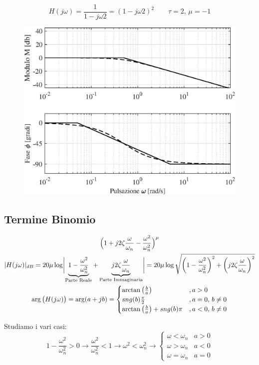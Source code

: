 \begin{nexample}
	\[ H(j\omega) = \frac{1}{1-j\omega2} = (1-j\omega2)^2 \qquad\tau = 2, \, \mu = -1 \]
\begin{figure}[H]
	\centering
	\includegraphics[width=0.7\linewidth]{immagini/cap6_Bode/es4}
	\label{fig:Bode_es4}
\end{figure}	
\end{nexample}

\subsection{Termine Binomio}
\begin{gather*}
	\Big(1+j2\zeta\frac{\omega}{\omega_{n}}-\frac{\omega^2}{\omega^{2}_{n}} \Big)^{\mu}\\
	\abs{H(j\omega)}_{dB} = 20 \mu \log \Abs{\underbrace{1-\frac{\omega^2}{\omega^{2}_{n}}}_{\text{\scriptsize Parte Reale}}+\underbrace{j2\zeta\frac{\omega}{\omega_{n}}}_{\text{\scriptsize Parte Immaginaria}}} = 20\mu \log \sqrt{\bigg(1-\frac{\omega^2}{\omega^{2}_{n}} \bigg)^2+\bigg(j2\zeta\frac{\omega}{\omega_{n}}\bigg)^2}\\
	\arg\big(H(j\omega)\big) = \arg(a+jb) = 
	\begin{cases}
		\arctan\big(\frac{b}{a}\big) & ,a>0\\
		sng(b)\frac{\pi}{2} & ,a=0,\, b \ne 0\\
		\arctan\big(\frac{b}{a}\big) + sng(b)\pi & ,a<0,\, b \ne 0 
	\end{cases} 
\end{gather*}

Studiamo i vari casi:
\[ 
	1-\frac{\omega^2}{\omega^{2}_{n}}>0 \rightarrow \frac{\omega^2}{\omega^{2}_{n}} <1 \rightarrow \omega^2 < \omega^2_n \rightarrow 
	\begin{cases}
		\omega < \omega_n &a>0\\
		\omega > \omega_n &a<0\\
		\omega = \omega_n &a=0
	\end{cases}
\]

